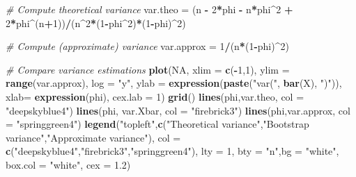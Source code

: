 \documentclass[]{book}
\newenvironment{Shaded}{\begin{snugshade}}{\end{snugshade}}
\newcommand{\KeywordTok}[1]{\textcolor[rgb]{0.13,0.29,0.53}{\textbf{#1}}}
\newcommand{\DataTypeTok}[1]{\textcolor[rgb]{0.13,0.29,0.53}{#1}}
\newcommand{\DecValTok}[1]{\textcolor[rgb]{0.00,0.00,0.81}{#1}}
\newcommand{\FloatTok}[1]{\textcolor[rgb]{0.00,0.00,0.81}{#1}}
\newcommand{\StringTok}[1]{\textcolor[rgb]{0.31,0.60,0.02}{#1}}
\newcommand{\CommentTok}[1]{\textcolor[rgb]{0.56,0.35,0.01}{\textit{#1}}}
\newcommand{\OtherTok}[1]{\textcolor[rgb]{0.56,0.35,0.01}{#1}}
\newcommand{\OperatorTok}[1]{\textcolor[rgb]{0.81,0.36,0.00}{\textbf{#1}}}
\newcommand{\NormalTok}[1]{#1}
\theoremstyle{definition}
\theoremstyle{definition}
\theoremstyle{definition}
\theoremstyle{remark}
\begin{document}
\begin{Shaded}
\begin{Highlighting}[]
\CommentTok{# Compute theoretical variance}
\NormalTok{var.theo =}\StringTok{ }\NormalTok{(n }\OperatorTok{-}\StringTok{ }\DecValTok{2}\OperatorTok{*}\NormalTok{phi }\OperatorTok{-}\StringTok{ }\NormalTok{n}\OperatorTok{*}\NormalTok{phi}\OperatorTok{^}\DecValTok{2} \OperatorTok{+}\StringTok{ }\DecValTok{2}\OperatorTok{*}\NormalTok{phi}\OperatorTok{^}\NormalTok{(n}\OperatorTok{+}\DecValTok{1}\NormalTok{))}\OperatorTok{/}\NormalTok{(n}\OperatorTok{^}\DecValTok{2}\OperatorTok{*}\NormalTok{(}\DecValTok{1}\OperatorTok{-}\NormalTok{phi}\OperatorTok{^}\DecValTok{2}\NormalTok{)}\OperatorTok{*}\NormalTok{(}\DecValTok{1}\OperatorTok{-}\NormalTok{phi)}\OperatorTok{^}\DecValTok{2}\NormalTok{)}

\CommentTok{# Compute (approximate) variance}
\NormalTok{var.approx =}\StringTok{ }\DecValTok{1}\OperatorTok{/}\NormalTok{(n}\OperatorTok{*}\NormalTok{(}\DecValTok{1}\OperatorTok{-}\NormalTok{phi)}\OperatorTok{^}\DecValTok{2}\NormalTok{)}

\CommentTok{# Compare variance estimations}
\KeywordTok{plot}\NormalTok{(}\OtherTok{NA}\NormalTok{, }\DataTypeTok{xlim =} \KeywordTok{c}\NormalTok{(}\OperatorTok{-}\DecValTok{1}\NormalTok{,}\DecValTok{1}\NormalTok{), }\DataTypeTok{ylim =} \KeywordTok{range}\NormalTok{(var.approx), }\DataTypeTok{log =} \StringTok{"y"}\NormalTok{, }
     \DataTypeTok{ylab =} \KeywordTok{expression}\NormalTok{(}\KeywordTok{paste}\NormalTok{(}\StringTok{"var("}\NormalTok{, }\KeywordTok{bar}\NormalTok{(X), }\StringTok{")"}\NormalTok{)),}
     \DataTypeTok{xlab=} \KeywordTok{expression}\NormalTok{(phi), }\DataTypeTok{cex.lab =} \DecValTok{1}\NormalTok{)}
\KeywordTok{grid}\NormalTok{()}
\KeywordTok{lines}\NormalTok{(phi,var.theo, }\DataTypeTok{col =} \StringTok{"deepskyblue4"}\NormalTok{)}
\KeywordTok{lines}\NormalTok{(phi, var.Xbar, }\DataTypeTok{col =} \StringTok{"firebrick3"}\NormalTok{)}
\KeywordTok{lines}\NormalTok{(phi,var.approx, }\DataTypeTok{col =} \StringTok{"springgreen4"}\NormalTok{)}
\KeywordTok{legend}\NormalTok{(}\StringTok{"topleft"}\NormalTok{,}\KeywordTok{c}\NormalTok{(}\StringTok{"Theoretical variance"}\NormalTok{,}\StringTok{"Bootstrap variance"}\NormalTok{,}\StringTok{"Approximate variance"}\NormalTok{), }
       \DataTypeTok{col =} \KeywordTok{c}\NormalTok{(}\StringTok{"deepskyblue4"}\NormalTok{,}\StringTok{"firebrick3"}\NormalTok{,}\StringTok{"springgreen4"}\NormalTok{), }\DataTypeTok{lty =} \DecValTok{1}\NormalTok{,}
       \DataTypeTok{bty =} \StringTok{"n"}\NormalTok{,}\DataTypeTok{bg =} \StringTok{"white"}\NormalTok{, }\DataTypeTok{box.col =} \StringTok{"white"}\NormalTok{, }\DataTypeTok{cex =} \FloatTok{1.2}\NormalTok{)}
\end{Highlighting}
\end{Shaded}
\end{document}
